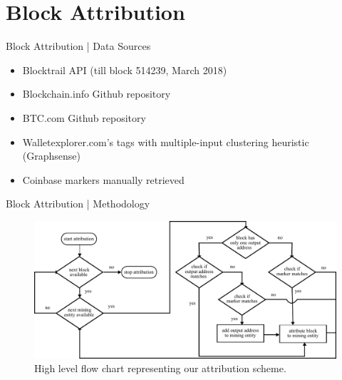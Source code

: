 \documentclass[10pt]{beamer}
\begin{document}

\section{Block Attribution} 
\begin{frame}[fragile]{Block Attribution | Data Sources}
    \begin{itemize}
        \item Blocktrail API (till block 514239, March 2018)
        \item Blockchain.info Github repository
        \item BTC.com Github repository
        \item Walletexplorer.com's tags with multiple-input clustering heuristic (Graphsense)
        \item Coinbase markers manually retrieved
    \end{itemize}
\end{frame}

\begin{frame}[fragile]{Block Attribution | Methodology}
    \begin{figure}
        \includegraphics[width=\textwidth]{images/attribution_horizontalized.pdf}
        \caption{High level flow chart representing our attribution scheme.}
        \label{fig:attribution}
    \end{figure}
\end{frame}
\end{document}
